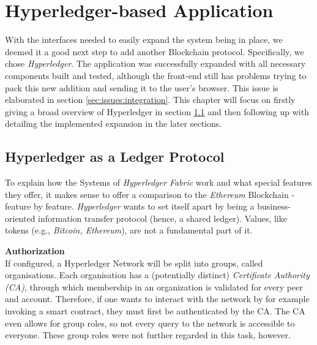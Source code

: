 %
\section{Hyperledger-based Application}
\label{sec:impr:hl}

With the interfaces needed to easily expand the system being in place, we deemed it a good next step to add another Blockchain protocol. Specifically, we chose \emph{Hyperledger}. The application was successfully expanded with all necessary components built and tested, although the front-end still has problems trying to pack this new addition and sending it to the user's browser. This issue is elaborated in section \ref{sec:issues:integration}. This chapter will focus on firstly giving a broad overview of Hyperledger in section \ref{sec:impr:hl:basics} and then following up with detailing the implemented expansion in the later sections.

\subsection{Hyperledger as a Ledger Protocol}
\label{sec:impr:hl:basics}

To explain how the Systems of \emph{Hyperledger Fabric} work and what special features they offer, it makes sense to offer a comparison to the \emph{Ethereum} Blockchain - feature by feature. \emph{Hyperledger} wants to set itself apart by being a business-oriented information transfer protocol (hence, a shared ledger). Values, like tokens (e.g., \emph{Bitcoin, Ethereum}), are not a fundamental part of it.

\textbf{Authorization} \\[0.2em]
If configured, a Hyperledger Network will be split into groups, called organisations. Each organisation has a (potentially distinct) \emph{Certificate Authority (CA)}, through which membership in an organization is validated for every peer and account. Therefore, if one wants to interact with the network by for example invoking a smart contract, they must first be authenticated  by the CA. The CA even allows for group roles, so not every query to the network is accessible to everyone. These group roles were not further regarded in this task, however.

